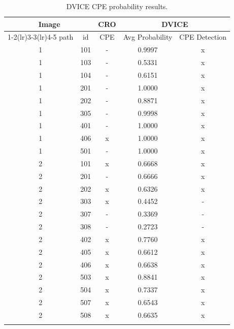 \begin{table}[htbp]
\centering
\small
\setlength{\tabcolsep}{8pt}
\caption{DVICE CPE probability results.}
\label{tab:dvice-results}

\begin{tabular}{ccccc}
\toprule
\multicolumn{2}{c}{\textbf{Image}} 
& \textbf{CRO} 
& \multicolumn{2}{c}{\textbf{DVICE}} \\
\cmidrule(lr){1-2}\cmidrule(lr){3-3}\cmidrule(lr){4-5}
path & id & CPE & Avg Probability & CPE Detection \\
\midrule
\arrayrulecolor{gray!30}
1 & 101 & - & 0.9997 & x \\
\hline
1 & 103 & - & 0.5331 & x \\
\hline
1 & 104 & - & 0.6151 & x \\
\hline
1 & 201 & - & 1.0000 & x \\
\hline
1 & 202 & - & 0.8871 & x \\
\hline
1 & 305 & - & 0.9998 & x \\
\hline
1 & 401 & - & 1.0000 & x \\
\hline
1 & 406 & x & 1.0000 & x \\
\hline
1 & 501 & - & 1.0000 & x \\
\hline
2 & 101 & x & 0.6668 & x \\
\hline
2 & 201 & - & 0.6666 & x \\
\hline
2 & 202 & x & 0.6326 & x \\
\hline
2 & 303 & x & 0.4452 & - \\
\hline
2 & 307 & - & 0.3369 & - \\
\hline
2 & 308 & - & 0.2723 & - \\
\hline
2 & 402 & x & 0.7760 & x \\
\hline
2 & 405 & x & 0.6612 & x \\
\hline
2 & 406 & x & 0.6638 & x \\
\hline
2 & 503 & x & 0.8841 & x \\
\hline
2 & 504 & x & 0.7337 & x \\
\hline
2 & 507 & x & 0.6543 & x \\
\hline
2 & 508 & x & 0.6635 & x \\
\arrayrulecolor{black}
\bottomrule
\end{tabular}

\end{table}